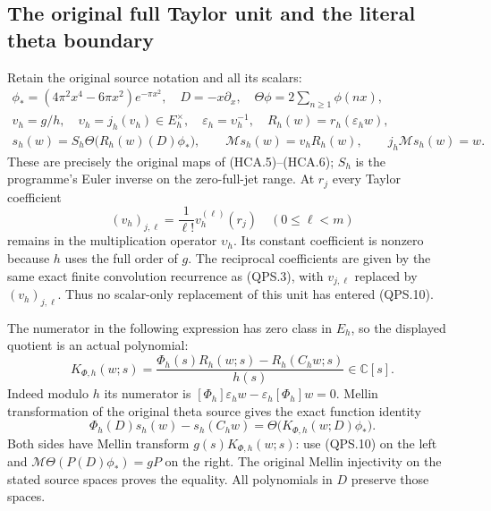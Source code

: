 \subsection{The original full Taylor unit and the literal theta boundary}

Retain the original source notation and all its scalars:
\[
 \begin{gathered}
 \phi_*=(4\pi^2x^4-6\pi x^2)e^{-\pi x^2},\quad
 D=-x\partial_x,\quad \Theta\phi=2\sum_{n\geq1}\phi(nx),\\
 v_h=g/h,\quad \upsilon_h=j_h(v_h)\in E_h^\times,\quad
 \varepsilon_h=\upsilon_h^{-1},\quad
 R_h(w)=r_h(\varepsilon_hw),\\
 s_h(w)=S_h\Theta\bigl(R_h(w)(D)\phi_*\bigr),\qquad
 \mathcal M s_h(w)=v_hR_h(w),\qquad j_h\mathcal M s_h(w)=w.
 \end{gathered}
 \tag{QPS.10}
\]
These are precisely the original maps of (HCA.5)--(HCA.6);
\(S_h\) is the programme's Euler inverse on the zero-full-jet
range. At \(r_j\) every Taylor coefficient
\[
 (v_h)_{j,\ell}=\frac{1}{\ell!}v_h^{(\ell)}(r_j)
 \quad(0\leq\ell<m)
 \tag{QPS.11}
\]
remains in the multiplication operator \(\upsilon_h\). Its constant
coefficient is nonzero because \(h\) uses the full order of \(g\).
The reciprocal coefficients are given by the same exact finite
convolution recurrence as (QPS.3), with \(v_{j,\ell}\) replaced
by \((v_h)_{j,\ell}\). Thus no scalar-only replacement of this unit
has entered (QPS.10).

The numerator in the following expression has zero class in \(E_h\),
so the displayed quotient is an actual polynomial:
\[
 K_{\Phi,h}(w;s)=
   \frac{\Phi_h(s)R_h(w;s)-R_h(C_hw;s)}{h(s)}
   \in\mathbb C[s].
 \tag{QPS.12}
\]
Indeed modulo \(h\) its numerator is
\([\Phi_h]\varepsilon_hw-\varepsilon_h[\Phi_h]w=0\).
Mellin transformation of the original theta source gives the exact
function identity
\[
 \Phi_h(D)s_h(w)-s_h(C_hw)
      =\Theta\bigl(K_{\Phi,h}(w;D)\phi_*\bigr).
 \tag{QPS.13}
\]
Both sides have Mellin transform \(g(s)K_{\Phi,h}(w;s)\):
use (QPS.10) on the left and
\(\mathcal M\Theta(P(D)\phi_*)=gP\) on the right.
The original Mellin injectivity on the stated source spaces proves
the equality. All polynomials in \(D\) preserve those spaces.

